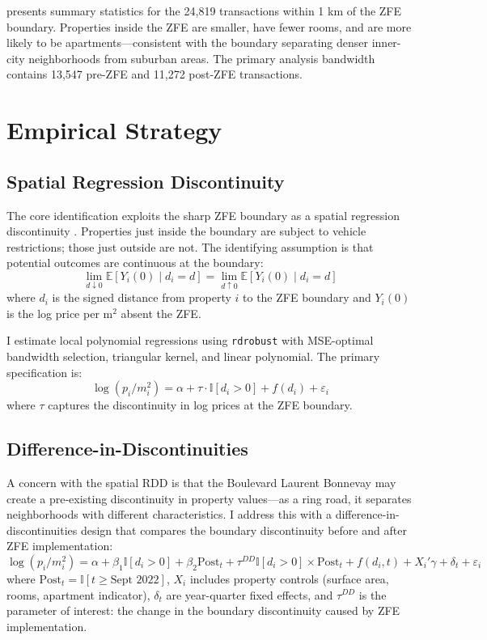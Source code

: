 \documentclass[12pt]{article}
\newcommand{\E}{\mathbb{E}}
\newcommand{\ind}{\mathbb{I}}
\begin{document}
 presents summary statistics for the 24,819 transactions within 1 km of the ZFE boundary. Properties inside the ZFE are smaller, have fewer rooms, and are more likely to be apartments---consistent with the boundary separating denser inner-city neighborhoods from suburban areas. The primary analysis bandwidth contains 13,547 pre-ZFE and 11,272 post-ZFE transactions.


\section{Empirical Strategy}

\subsection{Spatial Regression Discontinuity}

The core identification exploits the sharp ZFE boundary as a spatial regression discontinuity \citep{keele2015geographic, dell2010persistent}. Properties just inside the boundary are subject to vehicle restrictions; those just outside are not. The identifying assumption is that potential outcomes are continuous at the boundary:
\begin{equation}
\lim_{d \downarrow 0} \E[Y_i(0) \mid d_i = d] = \lim_{d \uparrow 0} \E[Y_i(0) \mid d_i = d]
\end{equation}
where $d_i$ is the signed distance from property $i$ to the ZFE boundary and $Y_i(0)$ is the log price per m$^2$ absent the ZFE.

I estimate local polynomial regressions using \texttt{rdrobust} \citep{calonico2014robust, calonico2020rdrobust} with MSE-optimal bandwidth selection, triangular kernel, and linear polynomial. The primary specification is:
\begin{equation}
\log(p_i / m^2_i) = \alpha + \tau \cdot \ind[d_i > 0] + f(d_i) + \varepsilon_i
\end{equation}
where $\tau$ captures the discontinuity in log prices at the ZFE boundary.

\subsection{Difference-in-Discontinuities}

A concern with the spatial RDD is that the Boulevard Laurent Bonnevay may create a pre-existing discontinuity in property values---as a ring road, it separates neighborhoods with different characteristics. I address this with a difference-in-discontinuities design \citep{grembi2016fiscal} that compares the boundary discontinuity before and after ZFE implementation:
\begin{equation}
\log(p_i / m^2_i) = \alpha + \beta_1 \ind[d_i > 0] + \beta_2 \text{Post}_t + \tau^{DD} \ind[d_i > 0] \times \text{Post}_t + f(d_i, t) + X_i'\gamma + \delta_t + \varepsilon_i
\end{equation}
where $\text{Post}_t = \ind[t \geq \text{Sept 2022}]$, $X_i$ includes property controls (surface area, rooms, apartment indicator), $\delta_t$ are year-quarter fixed effects, and $\tau^{DD}$ is the parameter of interest: the change in the boundary discontinuity caused by ZFE implementation.
\end{document}
